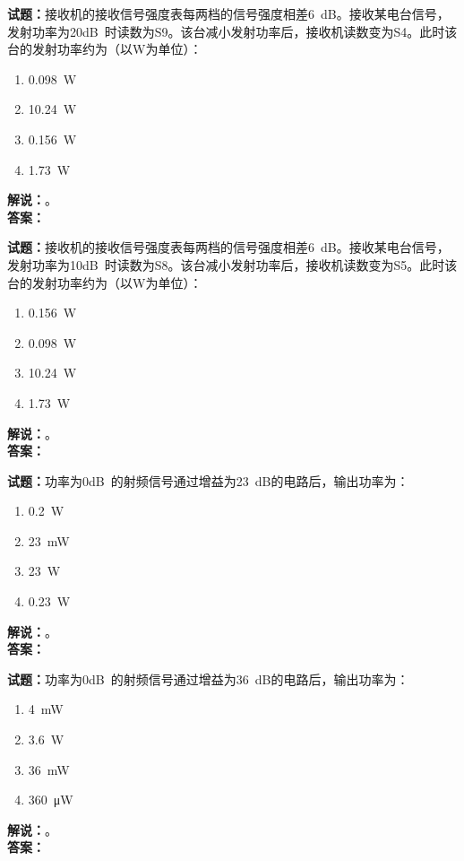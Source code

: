 \documentclass{ctexbook}
\begin{document}
\noindent\textbf{试题：}接收机的接收信号强度表每两档的信号强度相差\SI{6}{\dB}。接收某电台信号，发射功率为\num{20}\unit[qualifier-mode=combine]{\deci\bel{}}时读数为S9。该台减小发射功率后，接收机读数变为S4。此时该台的发射功率约为（以W为单位）：
\begin{enumerate}[leftmargin=3em]
  \item \SI{0.098}{\W}
  \item \SI{10.24}{\W}
  \item \SI{0.156}{\W}
  \item \SI{1.73}{\W}
\end{enumerate}
\noindent\textbf{解说：}\textbf{}。\\\noindent\textbf{答案：}

\vspace{\baselineskip}

\noindent\textbf{试题：}接收机的接收信号强度表每两档的信号强度相差\SI{6}{\dB}。接收某电台信号，发射功率为\num{10}\unit[qualifier-mode=combine]{\deci\bel{}}时读数为S8。该台减小发射功率后，接收机读数变为S5。此时该台的发射功率约为（以W为单位）：
\begin{enumerate}[leftmargin=3em]
  \item \SI{0.156}{\W}
  \item \SI{0.098}{\W}
  \item \SI{10.24}{\W}
  \item \SI{1.73}{\W}
\end{enumerate}
\noindent\textbf{解说：}\textbf{}。\\\noindent\textbf{答案：}

\vspace{\baselineskip}

\noindent\textbf{试题：}功率为\num{0}\unit[qualifier-mode=combine]{\deci\bel{}}的射频信号通过增益为\SI{23}{\dB}的电路后，输出功率为：
\begin{enumerate}[leftmargin=3em]
  \item \SI{0.2}{\W}
  \item \SI{23}{\mW}
  \item \SI{23}{\W}
  \item \SI{0.23}{\W}
\end{enumerate}
\noindent\textbf{解说：}\textbf{}。\\\noindent\textbf{答案：}

\vspace{\baselineskip}

\noindent\textbf{试题：}功率为\num{0}\unit[qualifier-mode=combine]{\deci\bel{}}的射频信号通过增益为\SI{36}{\dB}的电路后，输出功率为：
\begin{enumerate}[leftmargin=3em]
  \item \SI{4}{\mW}
  \item \SI{3.6}{\W}
  \item \SI{36}{\mW}
  \item \SI{360}{\uW}
\end{enumerate}
\noindent\textbf{解说：}\textbf{}。\\\noindent\textbf{答案：}
\end{document}
